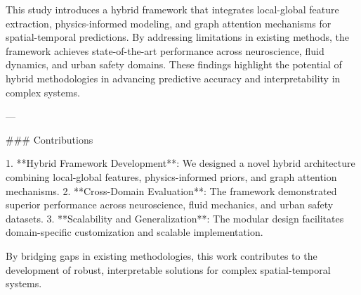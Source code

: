 This study introduces a hybrid framework that integrates local-global feature extraction, physics-informed modeling, and graph attention mechanisms for spatial-temporal predictions. By addressing limitations in existing methods, the framework achieves state-of-the-art performance across neuroscience, fluid dynamics, and urban safety domains. These findings highlight the potential of hybrid methodologies in advancing predictive accuracy and interpretability in complex systems.

---

### Contributions

1. **Hybrid Framework Development**: We designed a novel hybrid architecture combining local-global features, physics-informed priors, and graph attention mechanisms.
2. **Cross-Domain Evaluation**: The framework demonstrated superior performance across neuroscience, fluid mechanics, and urban safety datasets.
3. **Scalability and Generalization**: The modular design facilitates domain-specific customization and scalable implementation.

By bridging gaps in existing methodologies, this work contributes to the development of robust, interpretable solutions for complex spatial-temporal systems.